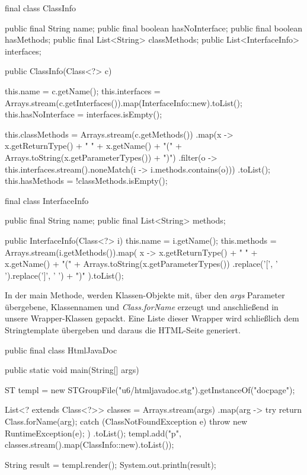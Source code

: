 \begin{code}[language=java, caption={Info Classes}, label={lst:Aufgabe6_info}]
final class ClassInfo {
    public final String name;
    public final boolean hasNoInterface;
    public final boolean hasMethods;
    public final List<String> classMethods;
    public List<InterfaceInfo> interfaces;

    public ClassInfo(Class<?> c) {
        this.name = c.getName();
        this.interfaces = Arrays.stream(c.getInterfaces()).map(InterfaceInfo::new).toList();
        this.hasNoInterface = interfaces.isEmpty();

        this.classMethods = Arrays.stream(c.getMethods())
                .map(x -> x.getReturnType() + " " + x.getName() + "(" + Arrays.toString(x.getParameterTypes()) + ")")
                .filter(o -> this.interfaces.stream().noneMatch(i -> i.methods.contains(o)))
                .toList();
        this.hasMethods = !classMethods.isEmpty();
    }
}

final class InterfaceInfo {
    public final String name;
    public final List<String> methods;

    public InterfaceInfo(Class<?> i) {
        this.name = i.getName();
        this.methods = Arrays.stream(i.getMethods()).map(
                x -> x.getReturnType() + " " + x.getName()
                        + "(" + Arrays.toString(x.getParameterTypes())
                        .replace('[', ' ').replace(']', ' ') + ")"
        ).toList();
    }
}
\end{code}
\newline

In der main Methode, werden Klassen-Objekte mit, über den \textit{args} Parameter übergebene, Klassennamen und \textit{Class.forName}
erzeugt und anschließend in unsere Wrapper-Klassen gepackt.
Eine Liste dieser Wrapper wird schließlich dem Stringtemplate übergeben und daraus die HTML-Seite generiert.

\begin{code}[language=java, caption={Main}, label={lst:Aufgabe6_main}]
public final class HtmlJavaDoc {

    public static void main(String[] args) {
        ST templ = new STGroupFile("u6/htmljavadoc.stg").getInstanceOf("docpage");

        List<? extends Class<?>> classes = Arrays.stream(args)
                .map(arg -> {
                    try {
                        return Class.forName(arg);
                    } catch (ClassNotFoundException e) {
                        throw new RuntimeException(e);
                    }
                })
                .toList();
        templ.add("p", classes.stream().map(ClassInfo::new).toList());

        String result = templ.render();
        System.out.println(result);
    }
}
\end{code}
\newline


